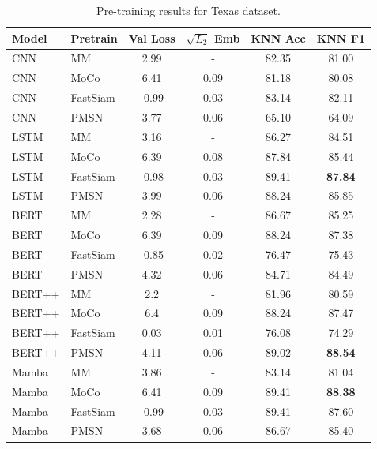 \begin{table}[ht!]
    \centering
    \caption{Pre-training results for Texas dataset.}
    \begin{tabular}{llcccc}
        \toprule
        Model & Pretrain & Val Loss & $\sqrt{L_2}$ Emb & KNN Acc & KNN F1 \\
        \midrule
        CNN & MM & 2.99 & - & 82.35 & 81.00 \\
        CNN & MoCo & 6.41 & 0.09 & 81.18 & 80.08 \\
        CNN & FastSiam & -0.99 & 0.03 & 83.14 & 82.11 \\
        CNN & PMSN & 3.77 & 0.06 & 65.10 & 64.09 \\
        LSTM & MM & 3.16 & - & 86.27 & 84.51 \\
        LSTM & MoCo & 6.39 & 0.08 & 87.84 & 85.44 \\ 
        LSTM & FastSiam & -0.98 & 0.03 & 89.41 & \textbf{87.84} \\
        LSTM & PMSN & 3.99 & 0.06 & 88.24 & 85.85 \\
        BERT & MM & 2.28 & - & 86.67 & 85.25 \\
        BERT & MoCo & 6.39 & 0.09 & 88.24 & 87.38 \\
        BERT & FastSiam & -0.85 & 0.02 & 76.47 & 75.43 \\
        BERT & PMSN & 4.32 & 0.06 & 84.71 & 84.49 \\
        BERT++ & MM & 2.2 & - & 81.96 & 80.59 \\
        BERT++ & MoCo & 6.4 & 0.09 & 88.24 & 87.47 \\
        \rowcolor{red!20} BERT++ & FastSiam & 0.03 & 0.01 & 76.08 & 74.29 \\
        BERT++ & PMSN & 4.11 & 0.06 & 89.02 & \textbf{88.54} \\
        Mamba & MM & 3.86 & - & 83.14 & 81.04 \\
        Mamba & MoCo & 6.41 & 0.09 & 89.41 & \textbf{88.38} \\
        Mamba & FastSiam & -0.99 & 0.03 & 89.41 & 87.60 \\
        Mamba & PMSN & 3.68 & 0.06 & 86.67 & 85.40 \\
        \bottomrule
    \end{tabular}
    \label{tab:pretraining_results_texas}
\end{table}

